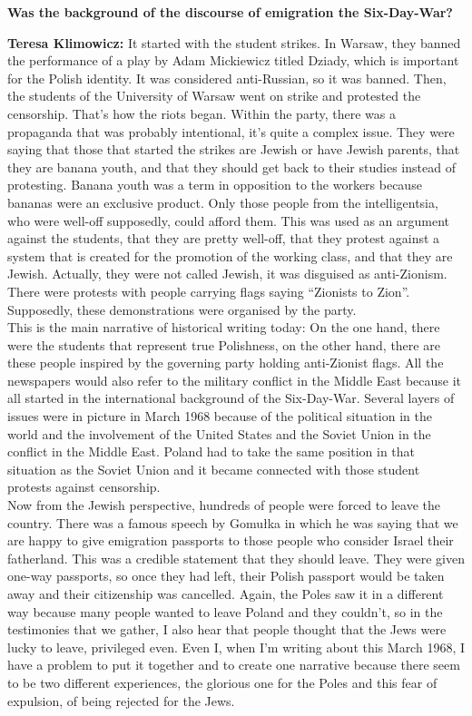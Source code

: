 \textbf{Was the background of the discourse of emigration the Six-Day-War?} 

\textbf{Teresa Klimowicz:} It started with the student strikes. In Warsaw, they banned the performance of a play by Adam Mickiewicz titled Dziady, which is important for the Polish identity. It was considered anti-Russian, so it was banned. Then, the students of the University of Warsaw went on strike and protested the censorship. That's how the riots began. Within the party, there was a propaganda that was probably intentional, it's quite a complex issue. They were saying that those that started the strikes are Jewish or have Jewish parents, that they are banana youth, and that they should get back to their studies instead of protesting. Banana youth was a term in opposition to the workers because bananas were an exclusive product. Only those people from the intelligentsia, who were well-off supposedly, could afford them. This was used as an argument against the students, that they are pretty well-off, that they protest against a system that is created for the promotion of the working class, and that they are Jewish. Actually, they were not called Jewish, it was disguised as anti-Zionism. There were protests with people carrying flags saying ``Zionists to Zion''. Supposedly, these demonstrations were organised by the party.\\ 
This is the main narrative of historical writing today: On the one hand, there were the students that represent true Polishness, on the other hand, there are these people inspired by the governing party holding anti-Zionist flags. All the newspapers would also refer to the military conflict in the Middle East because it all started in the international background of the Six-Day-War. Several layers of issues were in picture in March 1968 because of the political situation in the world and the involvement of the United States and the Soviet Union in the conflict in the Middle East. Poland had to take the same position in that situation as the Soviet Union and it became connected with those student protests against censorship.\\ 
Now from the Jewish perspective, hundreds of people were forced to leave the country. There was a famous speech by Gomułka in which he was saying that we are happy to give emigration passports to those people who consider Israel their fatherland. This was a credible statement that they should leave. They were given one-way passports, so once they had left, their Polish passport would be taken away and their citizenship was cancelled. Again, the Poles saw it in a different way because many people wanted to leave Poland and they couldn't, so in the testimonies that we gather, I also hear that people thought that the Jews were lucky to leave, privileged even. Even I, when I’m writing about this March 1968, I have a problem to put it together and to create one narrative because there seem to be two different experiences, the glorious one for the Poles and this fear of expulsion, of being rejected for the Jews.\\ 
